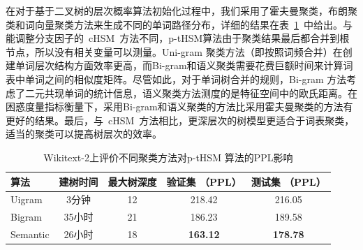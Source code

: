 在对于基于二叉树的层次概率算法初始化过程中，我们采用了霍夫曼聚类，布朗聚类和词向量聚类方法来生成不同的单词路径分布，详细的结果在表~\ref{table:p-thsm}~中给出。与能调整分支因子的~cHSM~方法不同，p-tHSM算法由于聚类结果最后都合并到根节点，所以没有相关变量可以测量。Uni-gram 聚类方法（即按照词频合并）在创建单词层次结构方面效率更高，而Bi-gram和语义聚类需要花费巨额时间来计算词表中单词之间的相似度矩阵。尽管如此，对于单词树合并的规则，Bi-gram 方法考虑了二元共现单词的统计信息，语义聚类方法测度的是特征空间中的欧氏距离。在困惑度量指标衡量下，采用Bi-gram和语义聚类的方法比采用霍夫曼聚类的方法有更好的结果。最后，与~cHSM~方法相比，更深层次的树模型更适合于词表聚类，适当的聚类可以提高树层次的效率。
\begin{table}[!ht]
  \centering
   \caption{Wikitext-2上评价不同聚类方法对p-tHSM 算法的PPL影响\label{table:p-thsm}}
  \begin{tabular}{lcccc} \toprule
  算法  &建树时间&最大树深度 &验证集 （PPL） & 测试集 （PPL）  \\ \midrule
  Uigram  &3分钟&12 &218.42& 216.05     \\
  Bigram  &35小时&21& 186.23& 189.58\\
  Semantic &26小时 &18& \textbf{163.12} & \textbf{178.78}\\
\bottomrule
  \end{tabular}
\end{table}

